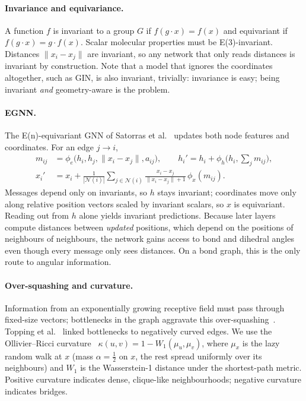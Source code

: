 \documentclass[11pt,a4paper]{article}
\begin{document}
\paragraph{Invariance and equivariance.} A function $f$ is invariant to a group $G$ if
$f(g\cdot x)=f(x)$ and equivariant if $f(g\cdot x) = g\cdot f(x)$. Scalar molecular
properties must be E(3)-invariant. Distances $\|x_i-x_j\|$ are invariant, so any network that
only reads distances is invariant by construction. Note that a model that ignores the
coordinates altogether, such as GIN, is also invariant, trivially: invariance is easy;
being invariant \emph{and} geometry-aware is the problem.

\paragraph{EGNN.} The E(n)-equivariant GNN of Satorras et al.~\cite{satorras2021} updates
both node features and coordinates. For an edge $j\to i$,
\begin{align}
  m_{ij} &= \phi_e\big(h_i, h_j, \|x_i-x_j\|, a_{ij}\big), \qquad
  h_i' = h_i + \phi_h\Big(h_i, \textstyle\sum_{j} m_{ij}\Big), \\
  x_i' &= x_i + \frac{1}{|\mathcal{N}(i)|}\sum_{j\in\mathcal{N}(i)} \frac{x_i-x_j}{\|x_i-x_j\|+1}\,\phi_x(m_{ij}).
\end{align}
Messages depend only on invariants, so $h$ stays invariant; coordinates move only along
relative position vectors scaled by invariant scalars, so $x$ is equivariant. Reading out
from $h$ alone yields invariant predictions. Because later layers compute distances between
\emph{updated} positions, which depend on the positions of neighbours of neighbours, the
network gains access to bond and dihedral angles even though every message only sees
distances. On a bond graph, this is the only route to angular information.

\paragraph{Over-squashing and curvature.} Information from an exponentially growing
receptive field must pass through fixed-size vectors; bottlenecks in the graph aggravate this
over-squashing~\cite{alon2021}. Topping et al.~\cite{topping2022} linked bottlenecks to
negatively curved edges. We use the Ollivier--Ricci curvature~\cite{ollivier2009}
$\kappa(u,v) = 1 - W_1(\mu_u,\mu_v)$, where $\mu_x$ is the lazy random walk at $x$ (mass
$\alpha=\tfrac12$ on $x$, the rest spread uniformly over its neighbours) and $W_1$ is the
Wasserstein-1 distance under the shortest-path metric. Positive curvature indicates dense,
clique-like neighbourhoods; negative curvature indicates bridges.
\end{document}
